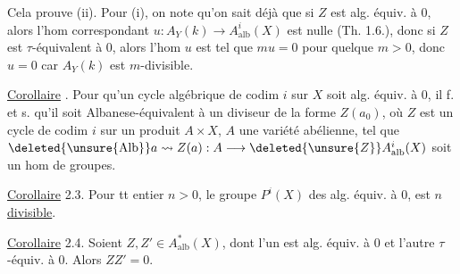 Cela prouve (ii). Pour (i), on note qu'on sait déjà que si \(Z\) est alg. équiv. à 0, alors l'hom correspondant \(u:A_Y(k)\longrightarrow A^i_{\mathrm{alb}}(X)\) est nulle (Th. 1.6.), donc si \(Z\) est \(\tau\)-équivalent à 0, alors l'hom \(u\) est tel que \(mu=0\) pour quelque \(m>0\), donc \(u=0\) car \(A_Y(k)\) est \(m\)-divisible.

\uline{Corollaire} . Pour qu'un cycle algébrique de codim \(i\) sur \(X\) soit alg. équiv. à 0, il f. et s. qu'il soit Albanese-équivalent à un diviseur de la forme \(Z(a_0)\), où  \(Z\) est un cycle de codim \(i\) sur un  produit \(A\times X\), \(A\) une variété abélienne, tel que \(\deleted{\unsure{\operatorname{Alb}}}a\leadsto Z(a):A\longrightarrow\deleted{\unsure{Z}}A^i_{\mathrm{alb}}(X)\) soit un hom de groupes.

\uline{Corollaire} 2.3. Pour tt entier \(n>0\), le groupe \(P^i(X)\) des  alg. équiv. à 0, est \(n\) \uline{divisible}.

\uline{Corollaire} 2.4. Soient \(Z,Z'\in A^*_{\mathrm{alb}}(X)\), dont l'un est alg. équiv. à 0 et l'autre \(\tau\)-équiv. à 0. Alors \(ZZ'=0\).
